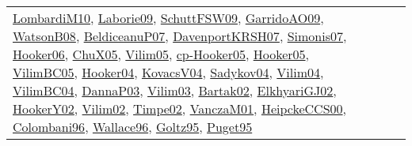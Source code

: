 {\begin{longtable}{llp{6cm}p{6cm}p{6cm}}
\href{papers/LombardiM10.pdf}{LombardiM10}\cite{LombardiM10}, \href{papers/Laborie09.pdf}{Laborie09}\cite{Laborie09}, \href{papers/SchuttFSW09.pdf}{SchuttFSW09}\cite{SchuttFSW09}, \href{articles/GarridoAO09.pdf}{GarridoAO09}\cite{GarridoAO09}, \href{papers/WatsonB08.pdf}{WatsonB08}\cite{WatsonB08}, \href{papers/BeldiceanuP07.pdf}{BeldiceanuP07}\cite{BeldiceanuP07}, \href{papers/DavenportKRSH07.pdf}{DavenportKRSH07}\cite{DavenportKRSH07}, \href{articles/Simonis07.pdf}{Simonis07}\cite{Simonis07}, \href{articles/Hooker06.pdf}{Hooker06}\cite{Hooker06}, \href{papers/ChuX05.pdf}{ChuX05}\cite{ChuX05}, \href{papers/Vilim05.pdf}{Vilim05}\cite{Vilim05}, \href{papers/cp-Hooker05.pdf}{cp-Hooker05}\cite{cp-Hooker05}, \href{articles/Hooker05.pdf}{Hooker05}\cite{Hooker05}, \href{articles/VilimBC05.pdf}{VilimBC05}\cite{VilimBC05}, \href{papers/Hooker04.pdf}{Hooker04}\cite{Hooker04}, \href{papers/KovacsV04.pdf}{KovacsV04}\cite{KovacsV04}, \href{papers/Sadykov04.pdf}{Sadykov04}\cite{Sadykov04}, \href{papers/Vilim04.pdf}{Vilim04}\cite{Vilim04}, \href{papers/VilimBC04.pdf}{VilimBC04}\cite{VilimBC04}, \href{papers/DannaP03.pdf}{DannaP03}\cite{DannaP03}, \href{papers/Vilim03.pdf}{Vilim03}\cite{Vilim03}, \href{papers/Bartak02.pdf}{Bartak02}\cite{Bartak02}, \href{papers/ElkhyariGJ02.pdf}{ElkhyariGJ02}\cite{ElkhyariGJ02}, \href{papers/HookerY02.pdf}{HookerY02}\cite{HookerY02}, \href{papers/Vilim02.pdf}{Vilim02}\cite{Vilim02}, \href{articles/Timpe02.pdf}{Timpe02}\cite{Timpe02}, \href{papers/VanczaM01.pdf}{VanczaM01}\cite{VanczaM01}, \href{articles/HeipckeCCS00.pdf}{HeipckeCCS00}\cite{HeipckeCCS00}, \href{papers/Colombani96.pdf}{Colombani96}\cite{Colombani96}, \href{articles/Wallace96.pdf}{Wallace96}\cite{Wallace96}, \href{papers/Goltz95.pdf}{Goltz95}\cite{Goltz95}, \href{papers/Puget95.pdf}{Puget95}\cite{Puget95}\\

\end{longtable}}
